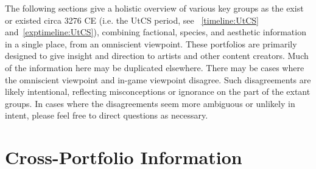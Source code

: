 \label{chapt:portfolios}
The following sections give a holistic overview of various key groups
as the exist or existed circa 3276 CE (i.e. the UtCS period, see
~\ref{timeline:UtCS} and~\ref{exptimeline:UtCS}), combining factional, species, and aesthetic
information in a single place, from an omniscient viewpoint. These
portfolios are primarily designed to give insight and direction to
artists and other content creators. Much of the information here may
be duplicated elsewhere. There may be cases where the omniscient
viewpoint and in-game viewpoint disagree. Such disagreements are
likely intentional, reflecting misconceptions or ignorance on the
part of the extant groups. In cases where the disagreements seem more
ambiguous or unlikely in intent, please feel free to direct questions
as necessary.

\section{Cross-Portfolio Information}
